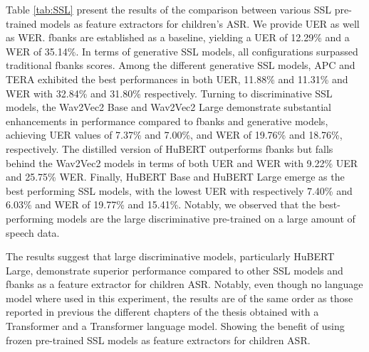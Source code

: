 Table \ref{tab:SSL} present the results of the comparison between various \ac{SSL} pre-trained models as feature extractors for children's \ac{ASR}. We provide \ac{UER} as well as \ac{WER}. \ac{fbanks} are established as a baseline, yielding a \ac{UER} of 12.29\% and a \ac{WER} of 35.14\%. In terms of generative \ac{SSL} models, all configurations surpassed traditional \ac{fbanks} scores. Among the different generative \ac{SSL} models, APC  and TERA exhibited the best performances in both \ac{UER}, 11.88\% and 11.31\% and \ac{WER} with 32.84\% and 31.80\% respectively. Turning to discriminative \ac{SSL} models, the Wav2Vec2 Base and Wav2Vec2 Large demonstrate substantial enhancements in performance compared to fbanks and generative models, achieving \ac{UER} values of 7.37\% and 7.00\%, and \ac{WER} of 19.76\% and 18.76\%, respectively. The distilled version of HuBERT outperforms \ac{fbanks} but falls behind the Wav2Vec2 models in terms of both \ac{UER} and \ac{WER} with 9.22\% \ac{UER} and 25.75\% \ac{WER}. Finally, HuBERT Base and HuBERT Large emerge as the best performing \ac{SSL} models, with the lowest \ac{UER} with respectively 7.40\% and 6.03\% and \ac{WER} of 19.77\% and 15.41\%. Notably, we observed that the best-performing models are the large discriminative pre-trained on a large amount of speech data.

The results suggest that large discriminative models, particularly HuBERT Large, demonstrate superior performance compared to other \ac{SSL} models and \ac{fbanks} as a feature extractor for children \ac{ASR}. Notably, even though no language model where used in this experiment, the results are of the same order as those reported in previous the different chapters of the thesis obtained with a Transformer and a Transformer language model. Showing the benefit of using frozen pre-trained \ac{SSL} models as feature extractors for children \ac{ASR}.

